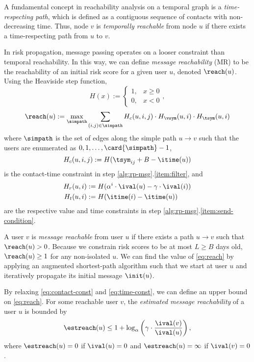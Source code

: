 \par A fundamental concept in reachability analysis on a temporal graph is a \emph{time-respecting path}, which is defined as a contiguous sequence of contacts with non-decreasing time. Thus, node $v$ is \emph{temporally reachable} \cite{Moody2002} from node $u$ if there exists a time-respecting path from $u$ to $v$.
\par In risk propagation, message passing operates on a looser constraint than temporal reachability. In this way, we can define \emph{message reachability} (MR) to be the reachability of an initial risk score for a given user $u$, denoted $\reach(u)$. Using the Heaviside step function,
\begin{displaymath}
	H(x) := 
	\begin{cases} 
		1, & x \geq 0 \\  
		0, & x < 0
	\end{cases},
\end{displaymath}
\begin{equation}\label{eq:reach}
	\reach(u) := \underset{\simpath}{\max} \sum_{(i, j) \in \simpath} H_c(u, i, j) \cdot H_{\vsym}(u, i) \cdot H_{\tsym}(u, i)
\end{equation}
where $\simpath$ is the set of edges along the simple path $u \rightarrow v$ such that the users are enumerated as $0, 1, \ldots, \card{\simpath} - 1$,
\begin{equation}
	H_c(u, i, j) := H(\tsym_{ij} + B - \itime(u)) \label{eq:contact-const}
\end{equation}
is the contact-time constraint in step \ref{alg:rp-msg}.\ref{item:filter}, and
\begin{align}
	H_r(u, i) &:= H(\alpha^i \cdot \ival(u) - \gamma \cdot \ival(i)) \label{eq:val-const}\\
	H_t(u, i) &:= H(\itime(i) - \itime(u)) \label{eq:time-const}
\end{align}
are the respective value and time constraints in step \ref{alg:rp-msg}.\ref{item:send-condition}.

\par A user $v$ is \emph{message reachable} from user $u$ if there exists a path $u \rightarrow v$ such that $\reach(u) > 0$. Because we constrain risk scores to be at most $L \geq B$ days old, $\reach(u) \geq 1$ for any non-isolated $u$. We can find the value of \eqref{eq:reach} by applying an augmented shortest-path algorithm \cite{Johnson1977} such that we start at user $u$ and iteratively propagate its initial message $\init(u)$.
\par By relaxing \eqref{eq:contact-const} and \eqref{eq:time-const}, we can define an upper bound on \eqref{eq:reach}. For some reachable user $v$, the \emph{estimated message reachability} of a user $u$ is bounded by
\begin{equation}\label{eq:estreach}
	\estreach(u) \leq 1 + \log_{\alpha}\left(\gamma \cdot \frac{\ival(v)}{\ival(u)} \right),
\end{equation}
where $\estreach(u) = 0$ if $\ival(u) = 0$ and $\estreach(u) = \infty$ if $\ival(v) = 0$.

